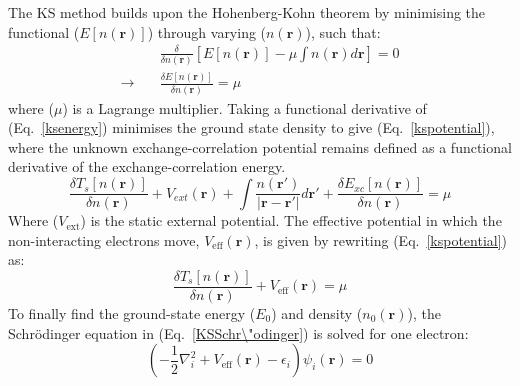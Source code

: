 %
The KS method builds upon the Hohenberg-Kohn theorem by minimising the functional ($E[n(\mathbf{r})]$) through varying ($n(\mathbf{r})$), such that:
%
\begin{equation} \label{minimise}
\begin{split}
& \frac{\delta}{\delta n(\mathbf{r})} \left[ E[n(\mathbf{r})] - \mu \int n(\mathbf{r}) d \mathbf{r} \right] = 0 \\
\rightarrow \quad & \frac{\delta E[n(\mathbf{r})]}{\delta n(\mathbf{r})} = \mu
\end{split}
\end{equation}
%
where ($\mu$) is a Lagrange multiplier. Taking a functional derivative of (Eq.~\ref{ksenergy}) minimises the ground state density to give (Eq.~\ref{kspotential}), where the unknown exchange-correlation potential remains defined as a functional derivative of the exchange-correlation energy.
%
\begin{equation} \label{kspotential}
\frac{\delta T_s[n(\mathbf{r})]}{\delta n(\mathbf{r})} + V_{ext}(\mathbf{r}) + \int \frac{n(\mathbf{r'})}{|\mathbf{r - r'}|}d \mathbf{r'} + \frac{\delta E_{xc}[n(\mathbf{r})]}{\delta n(\mathbf{r})}  = \mu 
\end{equation}
%
Where ($V_{\mathrm{ext}}$) is the static external potential. The effective potential in which the non-interacting electrons move, $V_{\mathrm{eff}}(\mathbf{r})$, is given by rewriting (Eq.~\ref{kspotential}) as:
%
\begin{equation} 
\frac{\delta T_s[n(\mathbf{r})]}{\delta n(\mathbf{r})} + V_{\mathrm{eff}}(\mathbf{r}) = \mu 
\end{equation}
%
To finally find the ground-state energy ($E_0$) and density ($n_0 (\mathbf{r})$), the Schr\"odinger equation in (Eq.~\ref{KSSchr\"odinger}) is solved for one electron:
%
\begin{equation}
\left( - \frac{1}{2} \nabla^2_i + V_{\mathrm{eff}}(\mathbf{r}) - \epsilon_i \right) \psi_i (\mathbf{r}) = 0
\end{equation} 
%
%
%
